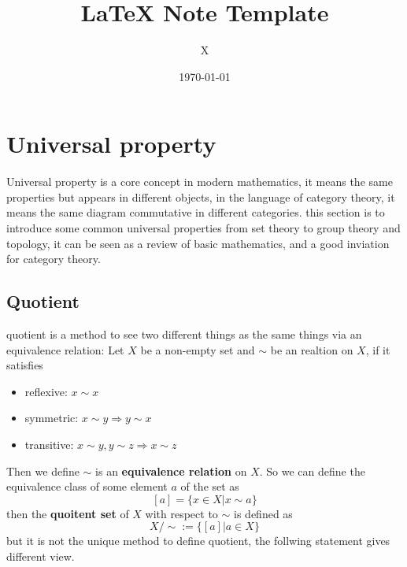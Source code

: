 \documentclass[12pt,a4paper]{article}
\title{\LaTeX{} Note Template}
\author{X}
\date{\today}
\begin{document}
{}
\tableofcontents
\newpage 

\section{Universal property}
Universal property is a core concept in modern mathematics, it means the same properties but appears in different objects, in the language of category theory, it means the same diagram commutative in different categories. this section is to introduce some common universal properties from set theory to group theory and topology, it can be seen as a review of basic mathematics, and a good inviation for category theory.

\subsection{Quotient}

quotient is a method to see two different things as the same things via an equivalence relation: Let \(X\) be a non-empty set and \(\sim\) be an realtion on \(X\), if it satisfies
\begin{itemize}
    \item reflexive: \(x \sim x\)
    \item symmetric: \(x \sim y \Rightarrow y \sim x    \)
    \item transitive: \(x \sim y, y \sim z \Rightarrow x \sim z\)
\end{itemize}
Then we define \(\sim\) is an \textbf{ equivalence relation} on \(X\). So we can define the equivalence class of some element \(a\) of the set as 
\[[a] = \{x \in X | x \sim a\}\]
then the \textbf{quoitent set} of \(X\) with respect to \(\sim\) is defined as
\[X/\sim := \{[a]| a \in X\}\]
but it is not the unique method to define quotient, the follwing statement gives different view.
\end{document}
